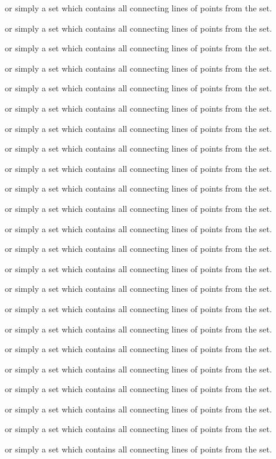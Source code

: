 \documentclass{article}
\begin{document}
or simply a set which contains all connecting lines of points from the
set.

or simply a set which contains all connecting lines of points from the
set.

or simply a set which contains all connecting lines of points from the
set.

or simply a set which contains all connecting lines of points from the
set.

or simply a set which contains all connecting lines of points from the
set.

or simply a set which contains all connecting lines of points from the
set.

or simply a set which contains all connecting lines of points from the
set.

or simply a set which contains all connecting lines of points from the
set.

or simply a set which contains all connecting lines of points from the
set.

or simply a set which contains all connecting lines of points from the
set.

or simply a set which contains all connecting lines of points from the
set.

or simply a set which contains all connecting lines of points from the
set.

or simply a set which contains all connecting lines of points from the
set.

or simply a set which contains all connecting lines of points from the
set.

or simply a set which contains all connecting lines of points from the
set.

or simply a set which contains all connecting lines of points from the
set.

or simply a set which contains all connecting lines of points from the
set.

or simply a set which contains all connecting lines of points from the
set.

or simply a set which contains all connecting lines of points from the
set.

or simply a set which contains all connecting lines of points from the
set.

or simply a set which contains all connecting lines of points from the
set.

or simply a set which contains all connecting lines of points from the
set.

or simply a set which contains all connecting lines of points from the
set.
\end{document}
